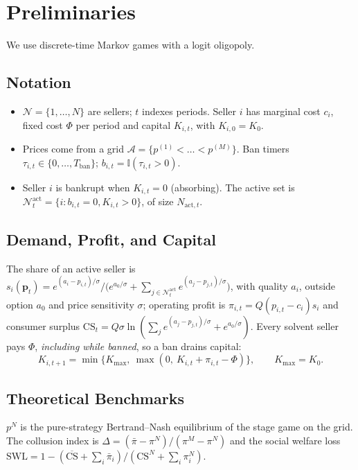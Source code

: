 \documentclass{article}
\newcommand{\Nact}{N_{\mathrm{act},t}}
\newcommand{\Tban}{T_{\mathrm{ban}}}
\begin{document}
\section{Preliminaries}
We use discrete-time Markov games \citep{littman1994} with a logit oligopoly.

\subsection{Notation}
\begin{itemize}
\item $\mathcal N=\{1,\dots,N\}$ are sellers; $t$ indexes periods. Seller $i$ has marginal cost $c_i$, fixed cost $\Phi$ per period and capital $K_{i,t}$, with $K_{i,0}=K_0$.
\item Prices come from a grid $\mathcal A=\{p^{(1)}<\dots<p^{(M)}\}$. Ban timers $\tau_{i,t}\in\{0,\dots,\Tban\}$; $b_{i,t}=\mathbb I(\tau_{i,t}>0)$.
\item Seller $i$ is bankrupt when $K_{i,t}=0$ (absorbing). The active set is $\mathcal N^{\mathrm{act}}_t=\{i:b_{i,t}=0,K_{i,t}>0\}$, of size $\Nact$.
\end{itemize}

\subsection{Demand, Profit, and Capital}
The share of an active seller is $s_i(\mathbf p_t)=e^{(a_i-p_{i,t})/\sigma}\big/\big(e^{a_0/\sigma}+\sum_{j\in\mathcal N^{\mathrm{act}}_t}e^{(a_j-p_{j,t})/\sigma}\big)$, with quality $a_i$, outside option $a_0$ and price sensitivity $\sigma$; operating profit is $\pi_{i,t}=Q(p_{i,t}-c_i)s_i$ and consumer surplus $\mathrm{CS}_t=Q\sigma\ln(\sum_j e^{(a_j-p_{j,t})/\sigma}+e^{a_0/\sigma})$. Every solvent seller pays $\Phi$, \emph{including while banned}, so a ban drains capital:
\begin{equation}
K_{i,t+1}=\min\{K_{\max},\ \max(0,\ K_{i,t}+\pi_{i,t}-\Phi)\},\qquad K_{\max}=K_0 .
\end{equation}

\subsection{Theoretical Benchmarks}
$p^N$ is the pure-strategy Bertrand--Nash equilibrium of the stage game on the grid. The collusion index is $\Delta=(\bar\pi-\pi^N)/(\pi^M-\pi^N)$ and the social welfare loss $\mathrm{SWL}=1-(\overline{\mathrm{CS}}+\sum_i\bar\pi_i)/(\mathrm{CS}^N+\sum_i\pi_i^N)$.
\end{document}

